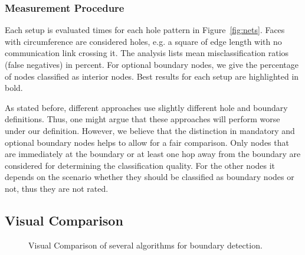 \documentclass{llncs}
\begin{document}
\subsubsection{Measurement Procedure}
Each setup is evaluated  times for each hole pattern in Figure~\ref{fig:nets}.
Faces with circumference  are considered holes, e.g. a square of edge length  with no communication link crossing it.
The analysis lists mean misclassification ratios (false negatives) in percent.
For optional boundary nodes, we give the percentage of nodes classified as interior nodes.
Best results for each setup are highlighted in bold.

As stated before, different approaches use slightly different hole and boundary definitions.
Thus, one might argue that these approaches will perform worse under our definition.
However, we believe that the distinction in mandatory and optional boundary nodes helps to allow for a fair comparison.
Only nodes that are immediately at the boundary or at least one hop away from the boundary are considered for determining the classification quality.
For the other nodes it depends on the scenario whether they should be classified as boundary nodes or not, thus they are not rated.


\subsection{Visual Comparison}\label{ssec:visual_comparison}

\begin{figure}[t]
\centering
\hfill
{}
\hfill
{}
\hfill
{}
\hfill
{}
\hfill{}

\hfill
{}
\hfill
{}
\hfill
{}
\hfill
{}
\hfill{}

\caption{Visual Comparison of several algorithms for boundary detection.}
\label{fig::visual_comp}

\end{figure}
\end{document}
